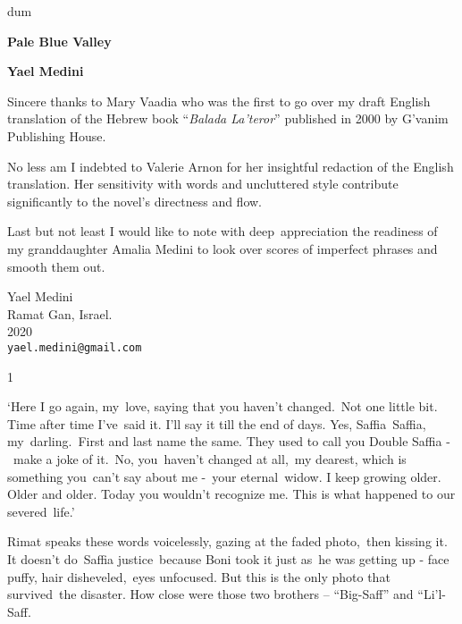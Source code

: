 \documentclass[twoside,11pt]{book}
\begin{document}
\thispagestyle{empty}
{\nullfont dum}
\vspace{.3\textheight}
\begin{center}
{\Huge \textbf{Pale Blue Valley}}

\bigskip

\textbf{\Large Yael Medini}
\end{center}
\vspace{.2\textheight}

Sincere thanks to Mary Vaadia who was the first to go over my draft
English translation of the Hebrew book ``\emph{Balada La'teror}''
published in 2000 by G'vanim Publishing House.

\bigskip
No less am I indebted to Valerie Arnon for her insightful redaction of
the English translation. Her sensitivity with words and uncluttered
style contribute significantly to the novel's directness and flow.

\bigskip
Last but not least I would like to note with deep~appreciation the
readiness of my granddaughter Amalia Medini to look over scores of
imperfect phrases and smooth them out.


\bigskip
{
\parindent=0pt
Yael Medini\\
Ramat Gan, Israel. \\
2020 \\
\texttt{yael.medini@gmail.com}
}


{1}

`Here I go again,
my\ love,{ saying that you haven't changed.\ Not one little
bit}. {Time after time I've\ said it. I'll say it
till the end of days. Yes, Saffia\ Saffia, my~darling.\ First and last name the same. }They used to call you Double
Saffia -\ make a joke of it.{\ No,
you}\textit{{\ }}{haven't
changed }at all,\ my dearest, which is something you\ {can't say about
me -}\ {your
}eternal{\ widow. I keep growing older. Older and older.
}Today{ you wouldn't recognize me. This is what happened to our
severed~life.'}

Rimat speaks these words voicelessly, gazing at the faded photo,\ then kissing it.
It{ doesn't
do\ Saffia} {justice\ because Boni took it }just
as\ he was getting up - face puffy, hair
disheveled,{\ }{eyes
unfocused. But this is the only photo that survived\ }the disaster{.
How close were those two brothers {}-- }{}``Big-Saff{}'' and {}``Li{}'l{}-Saff{\textquotedbl}. 
\end{document}
